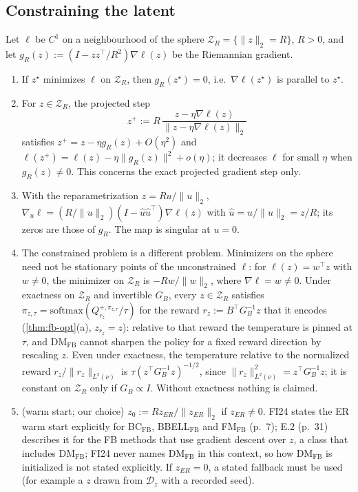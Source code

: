 \subsection{Constraining the latent}\label{sec:fbil-sphere}

\begin{proposition}\label{prop:fbil-sphere}
Let $\ell$ be $C^1$ on a neighbourhood of the sphere $\mathcal Z_R=\{\|z\|_2=R\}$, $R>0$, and let $g_R(z):=(I-zz^\top/R^2)\nabla\ell(z)$ be the Riemannian gradient.
\begin{enumerate}[nosep,label=(\alph*)]
\item If $z^\star$ minimizes $\ell$ on $\mathcal Z_R$, then $g_R(z^\star)=0$, i.e.\ $\nabla\ell(z^\star)$ is parallel to $z^\star$.
\item For $z\in\mathcal Z_R$, the projected step
  \begin{equation}\label{eq:fbil-proj}
  z^+:=R\,\frac{z-\eta\nabla\ell(z)}{\|z-\eta\nabla\ell(z)\|_2}
  \end{equation}
  satisfies $z^+=z-\eta g_R(z)+O(\eta^2)$ and $\ell(z^+)=\ell(z)-\eta\|g_R(z)\|^2+o(\eta)$; it decreases $\ell$ for small $\eta$ when $g_R(z)\ne0$. This concerns the exact projected gradient step only.
\item With the reparametrization $z=Ru/\|u\|_2$, $\nabla_u\ell=(R/\|u\|_2)(I-\hat u\hat u^\top)\nabla\ell(z)$ with $\hat u=u/\|u\|_2=z/R$; its zeros are those of $g_R$. The map is singular at $u=0$.
\item The constrained problem is a different problem. Minimizers on the sphere need not be stationary points of the unconstrained $\ell$: for $\ell(z)=w^\top z$ with $w\ne0$, the minimizer on $\mathcal Z_R$ is $-Rw/\|w\|_2$, where $\nabla\ell=w\ne0$.
  Under exactness on $\mathcal Z_R$ and invertible $G_B$, every $z\in\mathcal Z_R$ satisfies $\pi_{z,\tau}=\mathrm{softmax}(Q^{+,\pi_{z,\tau}}_{r_z}/\tau)$ for the reward $r_z:=B^\top G_B^{-1}z$ that it encodes (\cref{thm:fb-opt}(a), $z_{r_z}=z$): relative to that reward the temperature is pinned at $\tau$, and DM$_{\mathrm{FB}}$ cannot sharpen the policy for a fixed reward direction by rescaling $z$.
  Even under exactness, the temperature relative to the normalized reward $r_z/\|r_z\|_{L^2(\nu)}$ is $\tau(z^\top G_B^{-1}z)^{-1/2}$, since $\|r_z\|^2_{L^2(\nu)}=z^\top G_B^{-1}z$; it is constant on $\mathcal Z_R$ only if $G_B\propto I$. Without exactness nothing is claimed.
\item (warm start; our choice) $z_0:=Rz_{ER}/\|z_{ER}\|_2$ if $z_{ER}\ne0$. FI24 states the ER warm start explicitly for BC$_{\mathrm{FB}}$, BBELL$_{\mathrm{FB}}$ and FM$_{\mathrm{FB}}$ (p.~7); E.2 (p.~31) describes it for the FB methods that use gradient descent over $z$, a class that includes DM$_{\mathrm{FB}}$; FI24 never names DM$_{\mathrm{FB}}$ in this context, so how DM$_{\mathrm{FB}}$ is initialized is not stated explicitly. If $z_{ER}=0$, a stated fallback must be used (for example a $z$ drawn from $\mathcal D_z$ with a recorded seed).
\end{enumerate}
\end{proposition}

